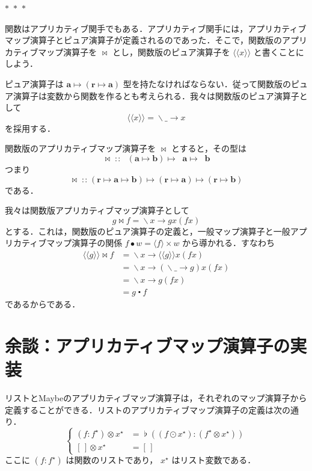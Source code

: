\documentclass[a4paper,twocolumn]{jsbook}
\newcommand{\Langle}{\langle\!\langle}
\newcommand{\Rangle}{\rangle\!\rangle}
\newcommand{\separator}{\begin{center}$*$~$*$~$*$\end{center}}
\newcommand{\mEmptyList}{{[\,]}}
\newcommand{\mAnyParam}{\_}
\DeclareMathOperator{\mAppMap}{\times}
\DeclareMathOperator{\mAppMapFunc}{\bowtie}
\DeclareMathOperator{\mAppMapList}{\otimes}
\DeclareMathOperator{\mComp}{\centerdot}
\DeclareMathOperator{\mConcat}{\flat}
\DeclareMathOperator{\mIn}{{:\!:}}
\DeclareMathOperator{\mLambda}{\backslash}
\DeclareMathOperator{\mLambdaArrow}{\rightarrow}
\DeclareMathOperator{\mMap}{\bullet}
\DeclareMathOperator{\mMapList}{\odot}
\DeclareMathOperator{\mMapsTo}{\mapsto}
\newcommand{\mType}[1]{\mathbf{#1}}
\newcommand{\mTypeConstructor}[1]{\textit{#1}}
\newcommand{\mFuncTypeConstructor}[1]{\mathop{\mTypeConstructor{Func}_\mType{#1}}}
\newcommand{\mFuncWith}[1]{\Langle#1\Rangle}
\newcommand{\mPureWith}[1]{\langle#1\rangle}
\newcommand{\mList}[1]{{#1}^\mathrm{\star}}
\newcommand{\mLambdaExp}[2]{\mLambda{#1}\mLambdaArrow{#2}}
\newcommand{\mProj}[2]{#1\mMapsTo#2}
\begin{document}
\separator

関数はアプリカティブ関手でもある．アプリカティブ関手には，アプリカティブマップ演算子とピュア演算子が定義されるのであった．そこで，関数版のアプリカティブマップ演算子を $\mAppMapFunc$ とし，関数版のピュア演算子を $\mFuncWith{x}$ と書くことにしよう．

ピュア演算子は $\mProj{\mType{a}}{(\mProj{\mType{r}}{\mType{a}})}$ 型を持たなければならない．従って関数版のピュア演算子は変数から関数を作るとも考えられる．我々は関数版のピュア演算子として
\begin{equation}
\mFuncWith{x}=\mLambdaExp{\mAnyParam}{x}
\end{equation}
を採用する．

関数版のアプリカティブマップ演算子を $\mAppMapFunc$ とすると，その型は
\begin{equation}
\mAppMapFunc
\mIn
\mProj{
  \mProj{
    \mFuncTypeConstructor{r}(\mProj{\mType{a}}{\mType{b}})
  }
  {
    \mFuncTypeConstructor{r}\mType{a}
  }
}
{
  \mFuncTypeConstructor{r}\mType{b}
}
\end{equation}
つまり
\begin{equation}
\mAppMapFunc
\mIn{}
\mProj{
  \mProj{
    (\mProj{\mType{r}}{\mProj{\mType{a}}{\mType{b}}})
  }
  {
    (\mProj{\mType{r}}{\mType{a}})
  }
}
{
  (\mProj{\mType{r}}{\mType{b}})
}
\end{equation}
である．

我々は関数版アプリカティブマップ演算子として
\begin{equation}
g\mAppMapFunc f=\mLambdaExp{x}{gx(fx)}
\end{equation}
とする．これは，関数版のピュア演算子の定義と，一般マップ演算子と一般アプリカティブマップ演算子の関係 $f\mMap w=\mPureWith{f}\mAppMap w$ から導かれる．すなわち
\begin{align}
\mFuncWith{g}\mAppMapFunc f
&=\mLambdaExp{x}{\mFuncWith{g}x(fx)}\\
&=\mLambdaExp{x}{(\mLambdaExp{\mAnyParam}{g})x(fx)}\\
&=\mLambdaExp{x}{g(fx)}\\
&=g\mComp f
\end{align}
であるからである．

\section{余談：アプリカティブマップ演算子の実装}

リストとMaybeのアプリカティブマップ演算子は，それぞれのマップ演算子から定義することができる．リストのアプリカティブマップ演算子の定義は次の通り．
\begin{equation}
\left\{
\begin{aligned}
(f:\mList{f})\mAppMapList\mList{x}&=\mConcat{}((f\mMapList\mList{x}):(\mList{f}\mAppMapList\mList{x}))\\
\mEmptyList\mAppMapList\mList{x}&=\mEmptyList
\end{aligned}
\right.
\end{equation}
ここに $(f:\mList{f})$ は関数のリストであり， $\mList{x}$ はリスト変数である．
\end{document}
